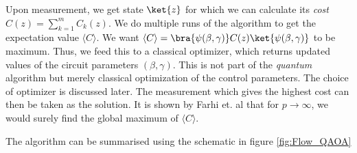 Upon measurement, we get state $\ket{z}$ for which we can calculate its \emph{cost} $C(z)= \sum_{k=1}^m C_k(z)$.
We do multiple runs of the algorithm to get the expectation value $ \langle C \rangle$.
We want $ \langle C \rangle = \bra{\psi(\beta, \gamma)}C(z)\ket{\psi(\beta, \gamma)}$ to be maximum.
Thus, we feed this to a classical optimizer, which returns updated values of the circuit parameters \textbf{$(\beta, \gamma)$}.
This is not part of the \textit{quantum} algorithm but merely classical optimization of the control parameters.
The choice of optimizer is discussed later.
The measurement which gives the highest cost can then be taken as the solution.
It is shown by Farhi et. al \cite{farhi2014quantum} that for $p \rightarrow \infty$, we would surely find the global maximum of $ \langle C \rangle$.

The algorithm can be summarised using the schematic in figure \ref{fig:Flow_QAOA}

